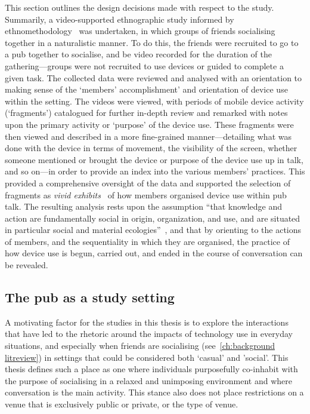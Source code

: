 \begin{revisedsubmission}
This section outlines the design decisions made with respect to the study.
Summarily, a video-supported ethnographic study informed by ethnomethodology~\citep{Garfinkel1967} was undertaken, in which groups of friends socialising together in a naturalistic manner.
To do this, the friends were recruited to go to a pub together to socialise, and be video recorded for the duration of the gathering---groups were not recruited to use devices or guided to complete a given task.
The collected data were reviewed and analysed with an orientation to making sense of the `members' accomplishment' and orientation of device use within the setting.
The videos were viewed, with periods of mobile device activity (`fragments') catalogued for further in-depth review and remarked with notes upon the primary activity or `purpose' of the device use.
These fragments were then viewed and described in a more fine-grained manner---detailing what was done with the device in terms of movement, the visibility of the screen, whether someone mentioned or brought the device or purpose of the device use up in talk, and so on---in order to provide an index into the various members' practices.
This provided a comprehensive oversight of the data and supported the selection of fragments as \textit{vivid exhibits}~\citep[p. 111--112]{Crabtree2012} of how members organised device use within pub talk.
The resulting analysis rests upon the assumption ``that knowledge and action are fundamentally social in origin, organization, and use, and are situated in particular social and material ecologies''~\citep[p. 41]{Jordan1995}, and that by orienting to the actions of members, and the sequentiality in which they are organised, the practice of how device use is begun, carried out, and ended in the course of conversation can be revealed.
 \end{revisedsubmission}






\subsection{The pub as a study setting}\label{sec:empirical pub design setting}
A motivating factor for the studies in this thesis is to explore the interactions that have led to the rhetoric around the impacts of technology use in everyday situations, and especially when friends are socialising (see~\autoref{ch:background litreview}) in settings that could be considered both `casual' and 'social'.
This thesis defines such a place as one where individuals purposefully co-inhabit with the purpose of socialising in a relaxed and unimposing environment and where conversation is the main activity.
This stance also does not place restrictions on a venue that is exclusively public or private, or the type of venue.


